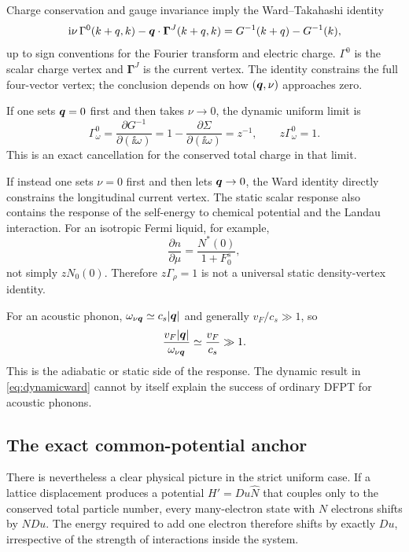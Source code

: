 Charge conservation and gauge invariance imply the Ward--Takahashi identity
\citep{Nambu1960}
\begin{equation}
  \mathrm{i}\nu\,\Gamma^0(k+q,k)
  -\bm{q}\cdot\bm{\Gamma}^{J}(k+q,k)
  = G^{-1}(k+q)-G^{-1}(k),
  \label{eq:ward}
\end{equation}
up to sign conventions for the Fourier transform and electric charge.
$\Gamma^0$ is the scalar charge vertex and $\bm{\Gamma}^{J}$ is the current
vertex.  The identity constrains the full four-vector vertex; the conclusion
depends on how $(\bm{q},\nu)$ approaches zero.

If one sets $\bm{q}=0$ first and then takes $\nu\to0$, the dynamic uniform limit is
\begin{equation}
  \Gamma^0_{\omega}
  = \frac{\partial G^{-1}}{\partial(\ii\omega)}
  = 1-\frac{\partial\Sigma}{\partial(\ii\omega)}
  = z^{-1},
  \qquad z\Gamma^0_{\omega}=1.
  \label{eq:dynamicward}
\end{equation}
This is an exact cancellation for the conserved total charge in that limit.

If instead one sets $\nu=0$ first and then lets $\bm{q}\to0$, the Ward identity
directly constrains the longitudinal current vertex.  The static scalar response
also contains the response of the self-energy to chemical potential and the
Landau interaction.  For an isotropic Fermi liquid, for example,
\begin{equation}
  \frac{\partial n}{\partial\mu}
  = \frac{N^*(0)}{1+F_0^s},
  \label{eq:compressibility}
\end{equation}
not simply $zN_0(0)$.  Therefore $z\Gamma_\rho=1$ is not a universal static
density-vertex identity.

For an acoustic phonon, $\omega_{\nu\bm{q}}\simeq c_s|\bm{q}|$ and generally
$v_F/c_s\gg1$, so
\begin{equation}
  \frac{v_F|\bm{q}|}{\omega_{\nu\bm{q}}}
  \simeq \frac{v_F}{c_s}\gg1.
  \label{eq:acousticstatic}
\end{equation}
This is the adiabatic or static side of the response.  The dynamic result in
\cref{eq:dynamicward} cannot by itself explain the success of ordinary DFPT for
acoustic phonons.

\subsection{The exact common-potential anchor}

There is nevertheless a clear physical picture in the strict uniform case.  If a
lattice displacement produces a potential $H'=Du\hat N$ that couples only to the
conserved total particle number, every many-electron state with $N$ electrons
shifts by $NDu$.  The energy required to add one electron therefore shifts by
exactly $Du$, irrespective of the strength of interactions inside the system.

